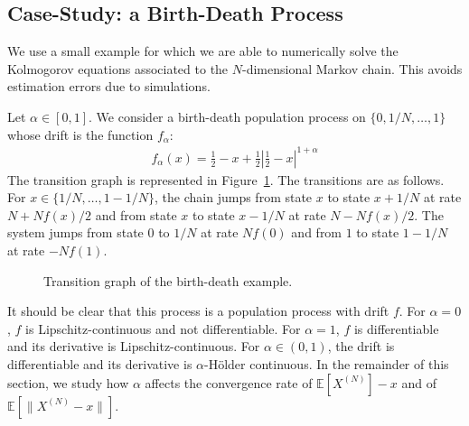 \documentclass[sigconf]{acmart}
\newcommand\XN{X^{(N)}}
\newcommand\sesp[1]{\mathbb{E}[#1]}
\newcommand\snorm[1]{\|#1\|}
\newcommand\abs[1]{\left|#1\right|}
\begin{document}
\subsection{Case-Study: a Birth-Death Process}

We use a small example for which we are able to numerically solve the
Kolmogorov equations associated to the $N$-dimensional Markov
chain. This avoids estimation errors due to simulations.

Let $\alpha\in[0,1]$. We consider a birth-death population process on
$\{0,1/N,\dots,1\}$ whose drift is the function $f_\alpha$:
\begin{align*}
  f_\alpha(x) = 
  \frac12-x + \frac12\abs{\frac12-x}^{1+\alpha} 
\end{align*}
The transition graph is represented in Figure~\ref{fig:BD_graph}.  The
transitions are as follows. For $x\in\{1/N,\dots,1-1/N\}$, the chain
jumps from state $x$ to state $x+1/N$ at rate $N+Nf(x)/2$ and from
state $x$ to state $x-1/N$ at rate $N-Nf(x)/2$. The system jumps from
state $0$ to $1/N$ at rate $Nf(0)$ and from $1$ to state $1-1/N$ at
rate $-Nf(1)$.
\begin{figure}[ht]
  \caption{Transition graph of the birth-death example. }
  \label{fig:BD_graph}
\end{figure}

It should be clear that this process is a population process with
drift $f$.  For $\alpha=0$, $f$ is Lipschitz-continuous and not
differentiable. For $\alpha=1$, $f$ is differentiable and its
derivative is Lipschitz-continuous. For $\alpha\in(0,1)$, the drift is
differentiable and its derivative is $\alpha$-Hölder
continuous. 
In the remainder of this section, we study how $\alpha$ affects the
convergence rate of $\sesp{\XN}-x$ and of $\sesp{\snorm{\XN-x}}$.
\end{document}
